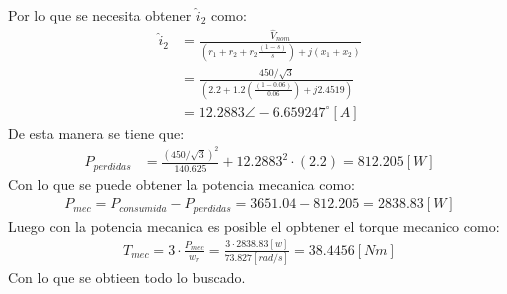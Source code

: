 \documentclass[
  11pt,
  letterpaper,
   addpoints,
   answers
  ]{exam}
\begin{document}
\begin{questions}
\begin{solution}
\begin{align}
        \end{align}
        Por lo que se necesita obtener $\hat{i}_{2}$ como:
        \begin{align}
            \hat{i}_{2}& = \frac{\hat{V}_{nom}}{\left(r_{1} + r_{2} + r_{2}\frac{(1-s)}{s} \right)+ j(x_{1}+x_{2})}\\
            &= \frac{450/\sqrt{3}}{(2.2+1.2\left(\frac{(1-0.06)}{0.06}\right)+ j2.4519)}\\
            &= 12.2883\angle -6.659247^{\circ}[A] 
        \end{align} 
        De esta manera se tiene que:
        \begin{align}
            P_{perdidas} &= \frac{(450/\sqrt{3})^{2}}{140.625} + 12.2883^{2} \cdot (2.2) = 812.205[W]
        \end{align}
        Con lo que se puede obtener la potencia mecanica como:
        \begin{align}
            P_{mec} = P_{consumida} - P_{perdidas} = 3651.04- 812.205 =  2838.83[W]
        \end{align}
        Luego con la potencia mecanica es posible el opbtener el torque mecanico como:
        \begin{align}
            T_{mec} = 3\cdot \frac{P_{mec}}{ w_{r}} = \frac{3 \cdot 2838.83[w] }{73.827 [rad/s]} = 38.4456[Nm]
        \end{align}
        Con lo que se obtieen todo lo buscado.

\end{solution}
\end{questions}
\end{document}
